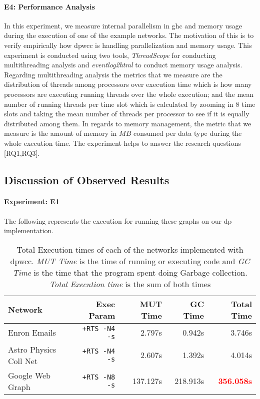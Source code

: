 \paragraph{E4: Performance Analysis}
In this experiment, we measure internal parallelism in \acrshort{ghc} and memory usage during the execution of one of the example networks. 
The motivation of this is to verify empirically how \acrshort{dpwcc} is handling parallelization and memory usage. 
This experiment is conducted using two tools, \textit{ThreadScope} \cite{threadscope} for conducting multithreading analysis and \textit{eventlog2html} \cite{eventlog2html} to conduct memory usage analysis. 
Regarding multithreading analysis the metrics that we measure are the distribution of threads among processors over execution time which is how many processors are executing running threads over the whole execution; and the mean number of running threads per time slot which is calculated by zooming in $8$ time slots and taking the mean number of threads per processor to see if it is equally distributed among them. 
In regards to memory management, the metric that we measure is the amount of memory in $MB$ consumed per data type during the whole execution time. 
The experiment helps to answer the research questions [RQ1,RQ3].

\subsection{Discussion of Observed Results}\label{new:experiments}
\paragraph{Experiment: E1}\label{sub:new:sec:e1}
The following represents the execution for running these graphs on our \acrshort{dp} implementation.

\begin{table}[H]
  \centering
  \begin{tabular}{|l|r|r|r|r|}
   \hline
   \textbf{Network} & \textbf{Exec Param} & \textbf{MUT Time} & \textbf{GC Time} & \textbf{Total Time}\\
   \hline
   Enron Emails & \texttt{+RTS -N4 -s} & 2.797s & 0.942s & 3.746s \\
   \hline
   Astro Physics Coll Net & \texttt{+RTS -N4 -s} & 2.607s & 1.392s & 4.014s \\
   \hline
   Google Web Graph & \texttt{+RTS -N8 -s} & 137.127s & 218.913s & \textbf{\textcolor{red}{356.058s}} \\
   \hline
  \end{tabular}
  \caption{Total Execution times of each of the networks implemented with \acrshort{dpwcc}. \textit{MUT Time} is the time of running or executing code and \textit{GC Time} is the time that the program spent doing Garbage collection. \textit{Total Execution time} is the sum of both times}
 \label{table:5}
 \end{table}

